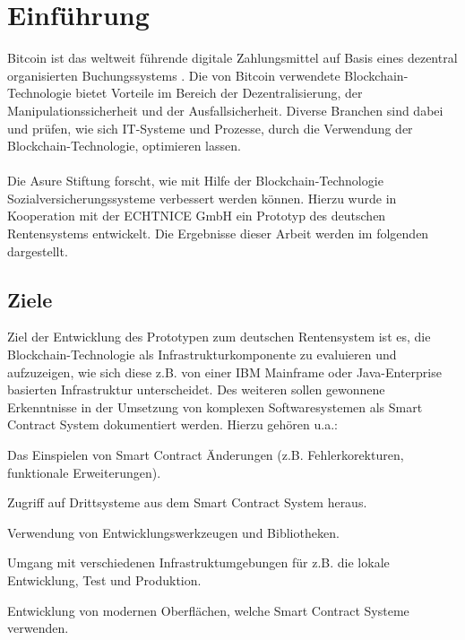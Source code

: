\section{Einführung}
Bitcoin ist das weltweit führende digitale Zahlungsmittel auf Basis eines dezentral organisierten Buchungssystems \cite{bitcoin}. Die von Bitcoin verwendete Blockchain-Technologie bietet Vorteile im Bereich der Dezentralisierung, der Manipulationssicherheit und der Ausfallsicherheit. Diverse Branchen sind dabei und prüfen, wie sich IT-Systeme und Prozesse, durch die Verwendung der Blockchain-Technologie, optimieren lassen.

\paragraph*{}
Die Asure Stiftung forscht, wie mit Hilfe der Blockchain-Technologie Sozialversicherungssysteme verbessert werden können. Hierzu wurde in Kooperation mit der ECHTNICE GmbH ein Prototyp des deutschen Rentensystems entwickelt. Die Ergebnisse dieser Arbeit werden im folgenden dargestellt.

\subsection{Ziele}

Ziel der Entwicklung des Prototypen zum deutschen Rentensystem ist es, die Blockchain-Technologie als Infrastrukturkomponente zu evaluieren und aufzuzeigen, wie sich diese z.B. von einer IBM Mainframe oder Java-Enterprise basierten Infrastruktur unterscheidet. Des weiteren sollen gewonnene Erkenntnisse in der Umsetzung von komplexen Softwaresystemen als Smart Contract System dokumentiert werden. Hierzu gehören u.a.:

\begin{compactenum}
\item Das Einspielen von Smart Contract Änderungen (z.B. Fehlerkorekturen, funktionale Erweiterungen).
\item Zugriff auf Drittsysteme aus dem Smart Contract System heraus.
\item Verwendung von Entwicklungswerkzeugen und Bibliotheken.
\item Umgang mit verschiedenen Infrastruktumgebungen für z.B. die lokale Entwicklung, Test und Produktion.
\item Entwicklung von modernen Oberflächen, welche Smart Contract Systeme verwenden.
\end{compactenum}

